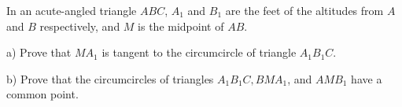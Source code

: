 In an acute-angled triangle $ABC$,  $A_1$ and $B_1$ are the feet of the altitudes from $A$ and $B$ respectively, and $M$ is the midpoint of $AB$.

a) Prove that $MA_1$ is tangent to the circumcircle of triangle $A_1B_1C$.

b) Prove that the circumcircles of triangles $A_1B_1C,BMA_1$,  and $AMB_1$ have a common point.
